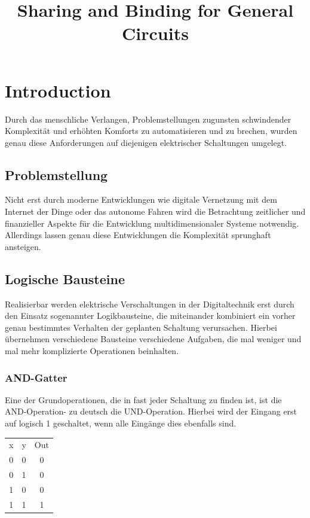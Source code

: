 \documentclass[conference]{IEEEtran}
\begin{document}
\begin{titlepage}

\title{Sharing and Binding for General Circuits\\}

\author{
}
\maketitle
\begin{abstract}

\end{abstract}
\end{titlepage}


\newpage
\section{Introduction}
Durch das menschliche Verlangen, Problemstellungen zugunsten schwindender Komplexität und erhöhten Komforts zu automatisieren und zu brechen, wurden genau diese Anforderungen auf diejenigen elektrischer Schaltungen umgelegt. 
\subsection{Problemstellung}
Nicht erst durch moderne Entwicklungen wie digitale Vernetzung mit dem Internet der Dinge oder das autonome Fahren wird die Betrachtung zeitlicher und finanzieller Aspekte für die Entwicklung multidimensionaler Systeme notwendig. Allerdings lassen genau diese Entwicklungen die Komplexität sprunghaft ansteigen.

\subsection{Logische Bausteine}
Realisierbar werden elektrische Verschaltungen in der Digitaltechnik erst durch den Einsatz sogenannter Logikbausteine, die miteinander kombiniert ein vorher genau bestimmtes Verhalten der geplanten Schaltung verursachen.
Hierbei übernehmen verschiedene Bausteine verschiedene Aufgaben, die mal weniger und mal mehr komplizierte Operationen beinhalten. 
\subsubsection{AND-Gatter}
Eine der Grundoperationen, die in fast jeder Schaltung zu finden ist, ist die AND-Operation- zu deutsch die UND-Operation. Hierbei wird der Eingang erst auf logisch 1 geschaltet, wenn alle Eingänge dies ebenfalls sind.\\
\begin{center}
\begin{tabular}[h]{ccc}
x&y&Out\\
0&0&0\\
0&1&0\\
1&0&0\\
1&1&1\\
\end{tabular}
\end{center}
\end{document}
